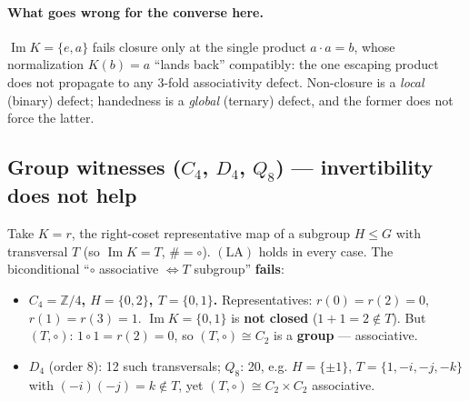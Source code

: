 \documentclass[11pt]{article}
\theoremstyle{plain}
\theoremstyle{definition}
\theoremstyle{remark}
\renewcommand{\Im}{\operatorname{Im}}
\begin{document}
\paragraph{What goes wrong for the converse here.} $\Im K = \{e,a\}$ fails closure only at the
single product $a\cdot a = b$, whose normalization $K(b) = a$ ``lands back'' compatibly: the one
escaping product does not propagate to any 3-fold associativity defect. Non-closure is a
\emph{local} (binary) defect; handedness is a \emph{global} (ternary) defect, and the former does
not force the latter.

\subsection{Group witnesses ($C_4$, $D_4$, $Q_8$) --- invertibility does not help}

Take $K = r$, the right-coset representative map of a subgroup $H \le G$ with transversal $T$ (so
$\Im K = T$, $\# = \circ$). $(\mathrm{LA})$ holds in every case. The biconditional ``$\circ$
associative $\iff T$ subgroup'' \textbf{fails}:

\begin{itemize}[leftmargin=1.6em]
\item \textbf{$C_4 = \mathbb{Z}/4$, $H = \{0, 2\}$, $T = \{0, 1\}$.} Representatives:
  $r(0)=r(2)=0$, $r(1)=r(3)=1$. $\Im K = \{0,1\}$ is \textbf{not closed} ($1+1 = 2 \notin T$). But
  $(T,\circ)$: $1\circ 1 = r(2) = 0$, so $(T,\circ) \cong C_2$ is a \textbf{group} --- associative.
\item \textbf{$D_4$} (order 8): 12 such transversals; \textbf{$Q_8$}: 20, e.g. $H = \{\pm1\}$,
  $T = \{1,-i,-j,-k\}$ with $(-i)(-j) = k \notin T$, yet $(T,\circ) \cong C_2\times C_2$
  associative.
\end{itemize}
\end{document}
